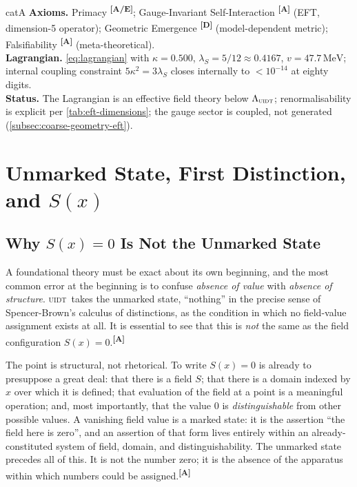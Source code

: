 \documentclass[12pt,a4paper,twoside]{article}
\theoremstyle{plain}
\theoremstyle{definition}
\theoremstyle{remark}
\newcommand{\UIDT}{\textsc{uidt}}
\newcommand{\MeV}{\,\mathrm{MeV}}
\newcommand{\catmark}[1]{\textsuperscript{\textsf{\textbf{[#1]}}}}
\newcommand{\lambdaS}{5/12 \approx 0.4167} %
\newcommand{\kappaVal}{0.500} %
\newcommand{\vVEV}{47.7\MeV} %
\begin{document}
\begin{evidencebox}{catA}
\textbf{Axioms.} Primacy \catmark{A/E}; Gauge-Invariant Self-Interaction \catmark{A} (EFT, dimension-5 operator); Geometric Emergence \catmark{D}
(model-dependent metric); Falsifiability \catmark{A} (meta-theoretical).\\[0.3em]
\textbf{Lagrangian.} \cref{eq:lagrangian} with $\kappa=\kappaVal$, $\lambda_S=\lambdaS$, $v=\vVEV$; internal coupling constraint $5\kappa^2=3\lambda_S$ closes
internally to $<10^{-14}$ at eighty digits.\\[0.3em]
\textbf{Status.} The Lagrangian is an effective field theory below $\Lambda_{\UIDT}$; renormalisability is explicit per \cref{tab:eft-dimensions}; the gauge sector is coupled, not generated (\cref{subsec:coarse-geometry-eft}).
\end{evidencebox}

\section{Unmarked State, First Distinction, and \texorpdfstring{$S(x)$}{S(x)}}
\label{sec:unmarked-distinction-sx}

\subsection{Why \texorpdfstring{$S(x)=0$}{S(x)=0} Is Not the Unmarked State}
\label{subsec:sx-zero-not-unmarked}

A foundational theory must be exact about its own beginning, and the most common error at the beginning is to confuse \emph{absence of value} with \emph{absence of structure}. \UIDT\ takes the unmarked state, ``nothing'' in the precise sense of Spencer-Brown's calculus of distinctions, as the condition in which no field-value assignment exists at all. It is essential to see that this is \emph{not} the same as the field configuration $S(x) = 0$.\catmark{A}

The point is structural, not rhetorical. To write $S(x) = 0$ is already to presuppose a great deal: that there is a field $S$; that there is a domain indexed by $x$ over which it is defined; that evaluation of the field at a point is a meaningful operation; and, most importantly, that the value $0$ is \emph{distinguishable} from other possible values. A vanishing field value is a marked state: it is the assertion ``the field here is zero'', and an assertion of that form lives entirely within an already-constituted system of field, domain, and distinguishability. The unmarked state precedes all of this. It is not the number zero; it is the absence of the apparatus within which numbers could be assigned.\catmark{A}
\end{document}
